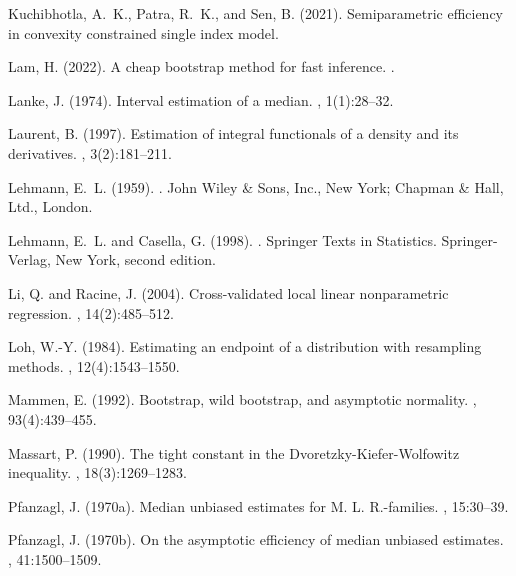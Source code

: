 \documentclass{article}
\numberwithin{myalgctr}{section}
\begin{document}
\begin{thebibliography}{}
Kuchibhotla, A.~K., Patra, R.~K., and Sen, B. (2021).
\newblock Semiparametric efficiency in convexity constrained single index
  model.

Lam, H. (2022).
\newblock A cheap bootstrap method for fast inference.
.

Lanke, J. (1974).
\newblock Interval estimation of a median.
, 1(1):28--32.

Laurent, B. (1997).
\newblock Estimation of integral functionals of a density and its derivatives.
, 3(2):181--211.

Lehmann, E.~L. (1959).
.
\newblock John Wiley \& Sons, Inc., New York; Chapman \& Hall, Ltd., London.

Lehmann, E.~L. and Casella, G. (1998).
.
\newblock Springer Texts in Statistics. Springer-Verlag, New York, second
  edition.

Li, Q. and Racine, J. (2004).
\newblock Cross-validated local linear nonparametric regression.
, 14(2):485--512.

Loh, W.-Y. (1984).
\newblock Estimating an endpoint of a distribution with resampling methods.
, 12(4):1543--1550.

Mammen, E. (1992).
\newblock Bootstrap, wild bootstrap, and asymptotic normality.
, 93(4):439--455.

Massart, P. (1990).
\newblock The tight constant in the {D}voretzky-{K}iefer-{W}olfowitz
  inequality.
, 18(3):1269--1283.

Pfanzagl, J. (1970a).
\newblock Median unbiased estimates for {M}. {L}. {R}.-families.
, 15:30--39.

Pfanzagl, J. (1970b).
\newblock On the asymptotic efficiency of median unbiased estimates.
, 41:1500--1509.


\end{thebibliography}
\end{document}
